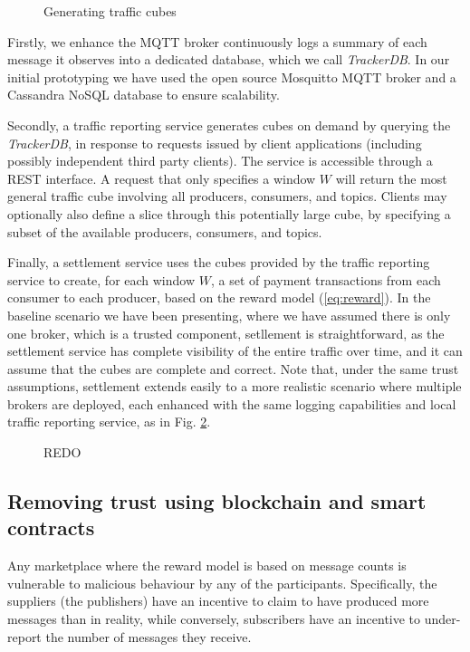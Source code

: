 \documentclass[conference]{IEEEtran}
\begin{document}
\begin{figure}
	\caption{Generating traffic cubes}
	\label{fig:cubes}
\end{figure}

Firstly, we enhance the MQTT broker continuously logs a summary of each message it observes into a dedicated database, which we call \textit{TrackerDB}.  In our initial prototyping we have used the open source Mosquitto MQTT broker and a Cassandra NoSQL database to ensure scalability. 

Secondly, a traffic reporting service generates cubes on demand by querying the \textit{TrackerDB}, in response to requests issued by client applications (including possibly independent third party clients). The service is accessible through a REST interface. A request that only specifies a window $ W $ will return the most general traffic cube involving all producers, consumers, and topics. Clients may optionally also define a slice through this potentially large cube, by specifying a subset of the available producers, consumers, and topics.

Finally, a settlement service uses the cubes provided by the traffic reporting service to create, for each window $ W $, a set of payment transactions from each consumer to each producer, based on the reward model (\ref{eq:reward}).
In the baseline scenario we have been presenting, where we have assumed there is only one broker, which is a trusted component, setllement is straightforward, as the settlement service has complete visibility of the entire traffic over time, and it can assume that the cubes are complete and correct.
Note that, under the same trust assumptions, settlement extends easily to a more realistic scenario where multiple brokers are deployed, each enhanced with the same logging capabilities and local traffic reporting service, as in Fig. \ref{fig:cubes-in-context}.

\begin{figure}
	\caption{REDO}
	\label{fig:cubes-in-context}
\end{figure}

\subsection{Removing trust using blockchain and smart contracts}

Any marketplace where the reward model is based on message counts is vulnerable to malicious behaviour by any of the participants. Specifically, the suppliers (the publishers) have an incentive to claim to have produced more messages than in reality, while conversely, subscribers have an incentive to under-report the number of messages they receive.
\end{document}
